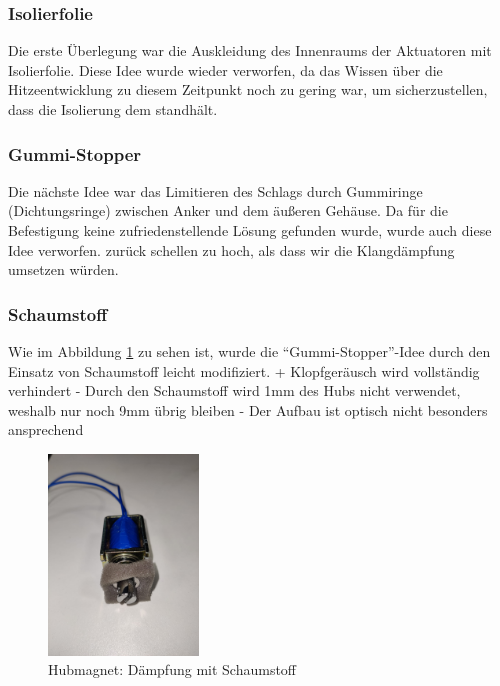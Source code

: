 \subsubsection{Isolierfolie}

Die erste Überlegung war die Auskleidung des Innenraums der Aktuatoren mit Isolierfolie.
Diese Idee wurde wieder verworfen, da das Wissen über die Hitzeentwicklung zu diesem Zeitpunkt noch zu gering war, um sicherzustellen, dass die Isolierung dem standhält. %

\subsubsection{Gummi-Stopper}

Die nächste Idee war das Limitieren des Schlags durch Gummiringe (Dichtungsringe) %
zwischen Anker und dem äußeren Gehäuse.
Da für die Befestigung keine zufriedenstellende Lösung gefunden wurde, wurde auch diese Idee verworfen.
zurück schellen zu hoch, als dass wir die Klangdämpfung umsetzen würden. %

\subsubsection{Schaumstoff}

Wie im Abbildung \ref{fig:schaumstoff} zu sehen ist, wurde die \enquote{Gummi-Stopper}-Idee durch den Einsatz von Schaumstoff leicht modifiziert. \newline
+ Klopfgeräusch wird vollständig verhindert \newline
- Durch den Schaumstoff wird 1mm des Hubs nicht verwendet, weshalb nur noch 9mm übrig bleiben \newline
- Der Aufbau ist optisch nicht besonders ansprechend

\begin{figure}[htbp]
	\centering
	\includegraphics [width=4cm] {img/Daempfung_Schaumstoff}
	\caption{Hubmagnet: Dämpfung mit Schaumstoff}
	\label{fig:schaumstoff}
\end{figure}

